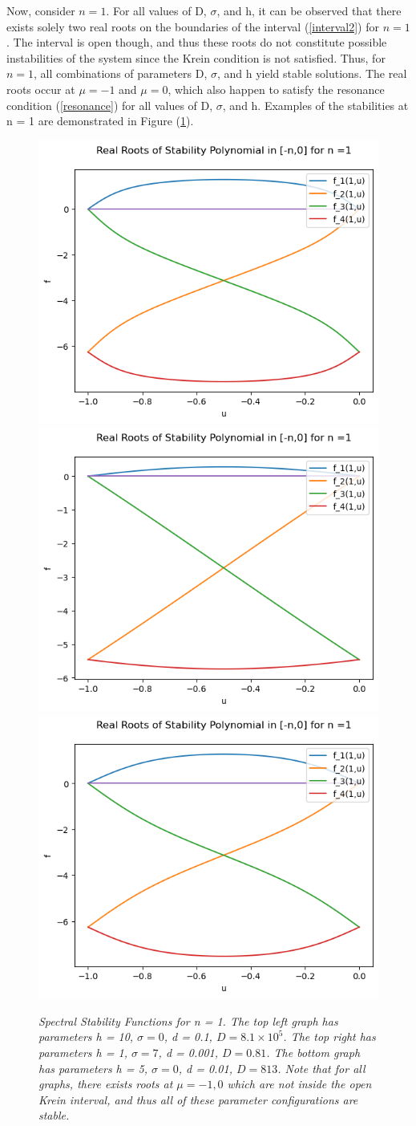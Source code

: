 \documentclass{article}
\begin{document}
Now, consider \(n = 1\). For all values of D, \(\sigma\), and h, it can be observed that there exists solely two real roots on the boundaries of the interval (\ref{interval2}) for \(n = 1\). The interval is open though, and thus these roots do not constitute possible instabilities of the system since the Krein condition is not satisfied. Thus, for \(n = 1\), all combinations of parameters D, \(\sigma\), and h yield stable solutions. The real roots occur at \(\mu = -1\) and \(\mu = 0 \), which also happen to satisfy the resonance condition (\ref{resonance}) for all values of D, \(\sigma\), and h. Examples of the stabilities at n = 1 are demonstrated in Figure (\ref{n=1}). 
\\

\begin{figure}[hbt!]
\centering
\includegraphics[width=.5\textwidth]{special4.png}\hfill
\includegraphics[width=.5\textwidth]{special5.png}\hfill
\includegraphics[width=.5\textwidth]{special6.png}\hfill
\caption{\emph{Spectral Stability Functions for n = 1. The top left graph has parameters h = 10, \(\sigma = 0\), d = 0.1, \(D = 8.1 \times 10^5\). The top right has parameters h = 1, \(\sigma = 7\), d = 0.001, \(D = 0.81\). The bottom graph has parameters h = 5, \(\sigma = 0\), d = 0.01, \(D = 813\). Note that for all graphs, there exists roots at \(\mu = -1,0\) which are not inside the open Krein interval, and thus all of these parameter configurations are stable. }} \label{n=1}
\end{figure}
\\
\end{document}
